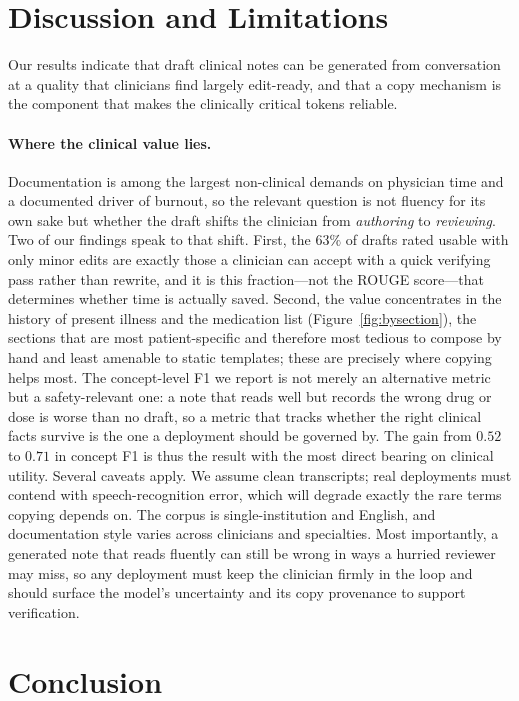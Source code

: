 \documentclass{article}
\begin{document}
\section{Discussion and Limitations}

Our results indicate that draft clinical notes can be generated from conversation at
a quality that clinicians find largely edit-ready, and that a copy mechanism is the
component that makes the clinically critical tokens reliable.

\paragraph{Where the clinical value lies.} Documentation is among the largest
non-clinical demands on physician time and a documented driver of burnout, so the
relevant question is not fluency for its own sake but whether the draft shifts the
clinician from \emph{authoring} to \emph{reviewing}. Two of our findings speak to
that shift. First, the $63\%$ of drafts rated usable with only minor edits are
exactly those a clinician can accept with a quick verifying pass rather than rewrite,
and it is this fraction---not the ROUGE score---that determines whether time is
actually saved. Second, the value concentrates in the history of present illness and
the medication list (Figure~\ref{fig:bysection}), the sections that are most
patient-specific and therefore most tedious to compose by hand and least amenable to
static templates; these are precisely where copying helps most. The concept-level F1
we report is not merely an alternative metric but a safety-relevant one: a note that
reads well but records the wrong drug or dose is worse than no draft, so a metric
that tracks whether the right clinical facts survive is the one a deployment should be
governed by. The gain from $0.52$ to $0.71$ in concept F1 is thus the result with the
most direct bearing on clinical utility. Several caveats apply.
We assume clean transcripts; real deployments must contend with speech-recognition
error, which will degrade exactly the rare terms copying depends on. The corpus is
single-institution and English, and documentation style varies across clinicians and
specialties. Most importantly, a generated note that reads fluently can still be
wrong in ways a hurried reviewer may miss, so any deployment must keep the clinician
firmly in the loop and should surface the model's uncertainty and its copy
provenance to support verification.

\section{Conclusion}
\end{document}
